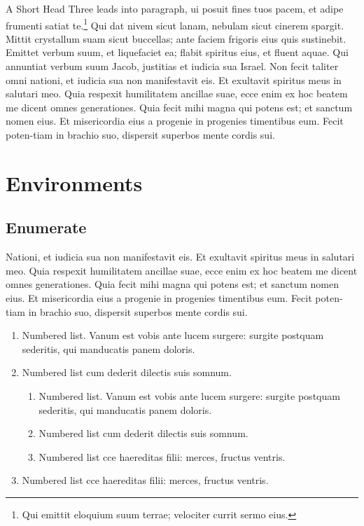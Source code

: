 \documentclass{arkiv}
\begin{document}
A Short Head Three leads into paragraph, ui posuit fines tuos pacem,
et adipe frumenti satiat te.\footnote{Qui emittit eloquium suum terrae;
velociter currit sermo eius.} Qui dat nivem sicut lanam, nebulam
sicut cinerem spargit. Mittit crystallum suam sicut buccellas; ante
faciem frigoris eius quis sustinebit. Emittet verbum suum, et
liquefaciet ea; flabit spiritus eius, et fluent aquae. Qui annuntiat
verbum suum Jacob, justitias et iudicia sua Israel. Non fecit taliter omni
nationi, et iudicia sua non manifestavit eis. Et exultavit spiritus meus
in salutari meo.  Quia respexit humilitatem ancillae suae, ecce enim ex
hoc beatem me dicent omnes generationes. Quia fecit mihi magna qui potens
est; et sanctum nomen eius. Et misericordia eius a progenie in progenies
timentibus eum. Fecit poten-tiam in brachio suo, dispersit superbos mente
cordis sui.



\section{Environments}

\subsection{Enumerate}

Nationi, et iudicia sua non manifestavit eis. Et exultavit spiritus meus
in salutari meo.  Quia respexit humilitatem ancillae suae, ecce enim ex
hoc beatem me dicent omnes generationes. Quia fecit mihi magna qui potens
est; et sanctum nomen eius. Et misericordia eius a progenie in progenies
timentibus eum. Fecit poten-tiam in brachio suo, dispersit superbos mente
cordis sui.


\begin{enumerate}
\item Numbered list. Vanum est vobis ante lucem surgere: surgite
postquam sederitis, qui manducatis panem doloris.

\item Numbered list cum dederit dilectis suis somnum.

\begin{enumerate}
\item Numbered list. Vanum est vobis ante lucem surgere: surgite
postquam sederitis, qui manducatis panem doloris.

\item Numbered list cum dederit dilectis suis somnum.

\item Numbered list cce haereditas filii: merces, fructus ventris.
\end{enumerate}

\item Numbered list cce haereditas filii: merces, fructus ventris.
\end{enumerate}
\end{document}

